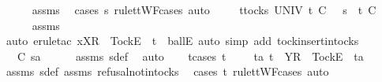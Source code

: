 \ \ \ \ \isamarkupfalse%
\ assms{\isacharparenleft}{}{\isacharparenright}\ \isamarkupfalse%
\ {\isacharparenleft}cases\ s{}{\isacharprime}\ rule{\isacharcolon}ttWF{\isachardot}cases{\isacharcomma}\ auto{\isacharparenright}\isanewline
\ \ \isamarkupfalse%
\ {}{\isacharcolon}\ {\isachardoublequoteopen}{\isasymforall}t{\isasymin}tocks\ UNIV{\isachardot}\ t\ {\isasymle}\isactrlsub C\ {\isasymsigma}\ {\isacharat}\ s{}\ {\isasymlongrightarrow}\ t\ {\isasymle}\isactrlsub C\ {\isasymsigma}{\isachardoublequoteclose}\isanewline
\ \ \ \ \isamarkupfalse%
\ assms{\isacharparenleft}{}{\isacharparenright}\ \isamarkupfalse%
\ {\isacharparenleft}auto{\isacharcomma}\ erule{\isacharunderscore}tac\ x{\isacharequal}{\isachardoublequoteopen}{\isacharbrackleft}X{\isacharbrackright}\isactrlsub R\ {\isacharhash}\ {\isacharbrackleft}Tock{\isacharbrackright}\isactrlsub E\ {\isacharhash}\ t{\isachardoublequoteclose}\ \ ballE{\isacharcomma}\ auto\ simp\ add{\isacharcolon}\ tock{\isacharunderscore}insert{\isacharunderscore}in{\isacharunderscore}tocks{\isacharparenright}\isanewline
\ \ \isamarkupfalse%
\ {}{\isacharcolon}\ {\isachardoublequoteopen}{\isasymsigma}\ {\isasymsubseteq}\isactrlsub C\ s{}{\isacharprime}a{\isachardoublequoteclose}\isanewline
\ \ \ \ \isamarkupfalse%
\ assms{\isacharparenleft}{}{\isacharparenright}\ s{}{\isacharprime}{\isacharunderscore}def\ \isamarkupfalse%
\ auto\isanewline
\ \ \isamarkupfalse%
\ t{\isacharunderscore}cases{\isacharcolon}\ {\isachardoublequoteopen}t\ {\isacharequal}\ {\isacharbrackleft}{\isacharbrackright}\ {\isasymor}\ {\isacharparenleft}{\isasymexists}\ ta{\isachardot}\ t\ {\isacharequal}\ {\isacharbrackleft}Y{\isacharbrackright}\isactrlsub R\ {\isacharhash}\ {\isacharbrackleft}Tock{\isacharbrackright}\isactrlsub E\ {\isacharhash}\ ta{\isacharparenright}{\isachardoublequoteclose}\isanewline
\ \ \ \ \isamarkupfalse%
\ assms{\isacharparenleft}{}{\isacharparenright}\ s{}{\isacharprime}{\isacharunderscore}def\ assms{\isacharparenleft}{}{\isacharparenright}\ refusal{\isacharunderscore}notin{\isacharunderscore}tocks\ \isamarkupfalse%
\ {\isacharparenleft}cases\ t\ rule{\isacharcolon}ttWF{\isachardot}cases{\isacharcomma}\ auto{\isacharparenright}\isanewline
\ \ \isamarkupfalse%
\ \isamarkupfalse%

